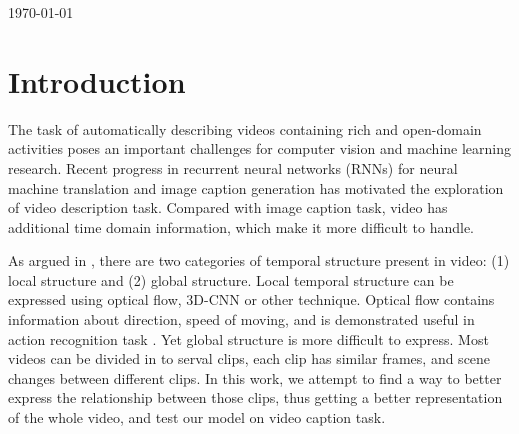 \begin{titlepage}


{\large \today}\\[3cm] %


\vfill %

\end{titlepage}

\tableofcontents
\clearpage


\section{Introduction}
The task of automatically describing videos containing rich and open-domain activities poses an important challenges for computer vision and machine learning research. Recent progress in recurrent neural networks (RNNs) for neural machine translation and image caption generation has motivated the exploration of video description task. Compared with image caption task, video has additional time domain information, which make it more difficult to handle.

As argued in \cite{yao2015describing}, there are two categories of temporal structure present in video: (1) local structure and (2) global structure. Local temporal structure can be expressed using optical flow, 3D-CNN \cite{tran2014c3d} or other technique. Optical flow contains information about direction, speed of moving, and is demonstrated useful in action recognition task \cite{simonyan2014two}. Yet global structure is more difficult to express. Most videos can be divided in to serval clips, each clip has similar frames, and scene changes between different clips. In this work, we attempt to find a way to better express the relationship between those clips, thus getting a better representation of the whole video, and test our model on video caption task.

